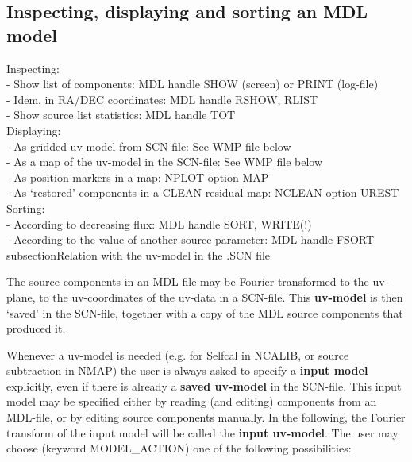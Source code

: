 
\subsection{Inspecting, displaying and sorting an MDL model} 
\label{mdl.inspect} 

Inspecting:\\ 
- Show list of components: MDL handle SHOW (screen) or PRINT (log-file)\\ 
- Idem, in RA/DEC coordinates: MDL handle RSHOW, RLIST\\ 
- Show source list statistics: MDL handle TOT \\ 

Displaying:\\ 
- As gridded uv-model from SCN file: See WMP file below\\ 
- As a map of the uv-model in the SCN-file: See WMP file below\\ 
- As position markers in a map: NPLOT option MAP\\ 
- As `restored' components in a CLEAN residual map: NCLEAN option UREST \\ 

Sorting:\\ 
- According to decreasing flux: MDL handle SORT, WRITE(!)\\ 
- According to the value of another source parameter: MDL handle FSORT\\ 



subsection{Relation with the uv-model in the .SCN file} 
\label{mdl.uvmodel} 

	The source components in an MDL file may be Fourier transformed to the
uv-plane, to the uv-coordinates of the uv-data in a SCN-file. 
This {\bf uv-model} is then `saved' in the SCN-file, together with a copy of
the MDL source components that produced it. 

	Whenever a uv-model is needed (e.g.  for Selfcal in NCALIB, or source
subtraction in NMAP) the user is always asked to specify a {\bf input model}
explicitly, even if there is already a {\bf saved uv-model} in the SCN-file. 
This input model may be specified either by reading 
(and editing) components from an MDL-file, or by editing source components
manually.  In the following, the Fourier transform of the input model will be
called the {\bf input uv-model}.  The user may choose (keyword MODEL\_ACTION)
one of the following possibilities: 

